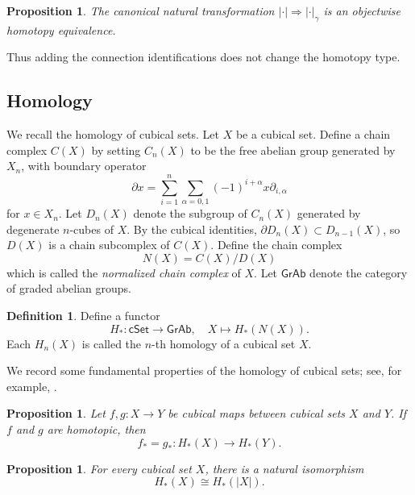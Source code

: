 \documentclass[oneside, 12pt]{amsart}
\numberwithin{equation}{section}
\theoremstyle{plain}
\newtheorem{proposition}[theorem]{Proposition}
\theoremstyle{definition}
\newtheorem{definition}[theorem]{Definition}
\theoremstyle{remark}
\newcommand{\cSet}{\mathsf{cSet}}
\begin{document}
	
	
	\begin{proposition}
		\label{realization connection}
		The canonical natural transformation $|\cdot|\Rightarrow|\cdot|_\gamma$ is an objectwise homotopy equivalence.
	\end{proposition}
	Thus adding the connection identifications does not change the homotopy type.
	
	
	\subsection{Homology}
	
	We recall the homology of cubical sets. Let $X$ be a cubical set. Define a chain complex $C(X)$ by setting $C_n(X)$ to be the free abelian group generated by $X_n$, with boundary operator
	\[
	\partial x=\sum_{i=1}^n\sum_{\alpha=0,1}(-1)^{i+\alpha}x\partial_{i,\alpha}
	\]
	for $x\in X_n$. Let $D_n(X)$ denote the subgroup of $C_n(X)$ generated by degenerate $n$-cubes of $X$. By the cubical identities, $\partial D_n(X)\subset D_{n-1}(X)$, so $D(X)$ is a chain subcomplex of $C(X)$. Define the chain complex
	\[
	N(X)=C(X)/D(X)
	\]
	which is called the \emph{normalized chain complex} of $X$. Let $\mathsf{GrAb}$ denote the category of graded abelian groups.
	
	
	
	\begin{definition}
		Define a functor
		\[
		H_*\colon\cSet\to\mathsf{GrAb},\quad X\mapsto H_*(N(X)).
		\]
		Each $H_n(X)$ is called the $n$-th homology of a cubical set $X$.
	\end{definition}
	
	
	
	We record some fundamental properties of the homology of cubical sets; see, for example, \cite{BGJW,F}.
	
	
	
	\begin{proposition}
		Let $f,g\colon X\to Y$ be cubical maps between cubical sets $X$ and $Y$. If $f$ and $g$ are homotopic, then
		\[
		f_*=g_*\colon H_*(X)\to H_*(Y).
		\]
	\end{proposition}
	
	
	
	\begin{proposition}
		For every cubical set $X$, there is a natural isomorphism
		\[
		H_*(X)\cong H_*(|X|).
		\]
	\end{proposition}
	
	
	
\end{document}
